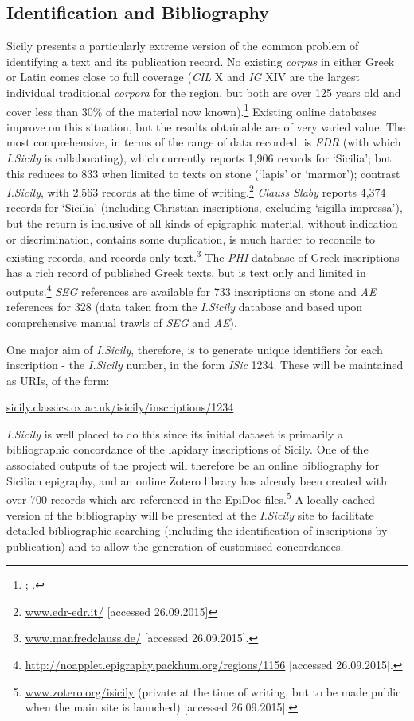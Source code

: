 \documentclass[amsthm,ebook]{saparticle}
\begin{document}
\subsection{Identification and Bibliography}


\noindent Sicily presents a particularly extreme version of the common problem of identifying a text and its publication record.
No existing \emph{corpus} in either Greek or Latin comes close to full coverage (\emph{CIL} X and \emph{IG} XIV are the largest individual
traditional \emph{corpora} for the region, but both are over 125 years old and cover less than 30\% of the material now
known).\footnote{\citet{Mommsen:1883aa}; \citet{kaibel_inscriptiones_1890}.} Existing online databases improve on this situation, but the results
obtainable are of very varied value. The most comprehensive, in terms of the range of data recorded, is \emph{EDR} (with which
\emph{I.Sicily} is collaborating), which currently reports 1,906 records for `Sicilia'; but this reduces to 833 when limited
to texts on stone (`lapis' or `marmor'); contrast \emph{I.Sicily}, with 2,563 records at the time of writing.\footnote{
\url{www.edr-edr.it/} [accessed 26.09.2015]} \emph{Clauss Slaby} reports 4,374 records for `Sicilia' (including Christian
inscriptions, excluding `sigilla impressa'), but the return is inclusive of all kinds of epigraphic material, without
indication or discrimination, contains some duplication, is much harder to reconcile to existing records, and records
only text.\footnote{ \url{www.manfredclauss.de/} [accessed 26.09.2015].} The \emph{PHI} database of Greek inscriptions has a rich
record of published Greek texts, but is text only and limited in outputs.\footnote{
\url{http://noapplet.epigraphy.packhum.org/regions/1156} [accessed 26.09.2015].} \emph{SEG} references are available for 733
inscriptions on stone and \emph{AE} references for 328 (data taken from the \emph{I.Sicily} database and based upon comprehensive
manual trawls of \emph{SEG} and \emph{AE}).

One major aim of \emph{I.Sicily}, therefore, is to generate unique identifiers for each inscription - the \emph{I.Sicily} number, in
the form \emph{ISic} 1234. These will be maintained as URIs, of the form:

\url{sicily.classics.ox.ac.uk/isicily/inscriptions/1234}

\emph{I.Sicily} is well placed to do this since its initial dataset is primarily a bibliographic concordance of the lapidary
inscriptions of Sicily. One of the associated outputs of the project will therefore be an online bibliography for
Sicilian epigraphy, and an online Zotero library has already been created with over 700 records which are referenced in
the EpiDoc files.\footnote{\url{www.zotero.org/isicily} (private at the time of writing, but to be made public when the main
site is launched) [accessed 26.09.2015].} A locally cached version of the bibliography will be presented at the
\emph{I.Sicily} site to facilitate detailed bibliographic searching (including the identification of inscriptions by
publication) and to allow the generation of customised concordances.
\end{document}
